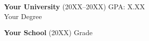 \item \textbf{Your University} (20XX--20XX) \hfill GPA: X.XX \\
Your Degree
\item \textbf{Your School} (20XX) \hfill Grade

